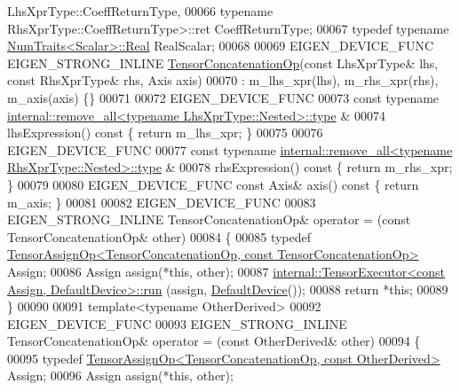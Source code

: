 \begin{DoxyCode}
      LhsXprType::CoeffReturnType,
00066                                                     \textcolor{keyword}{typename} RhsXprType::CoeffReturnType>::ret 
      CoeffReturnType;
00067     \textcolor{keyword}{typedef} \textcolor{keyword}{typename} \hyperlink{group___core___module_struct_eigen_1_1_num_traits}{NumTraits<Scalar>::Real} RealScalar;
00068 
00069     EIGEN\_DEVICE\_FUNC EIGEN\_STRONG\_INLINE \hyperlink{class_eigen_1_1_tensor_concatenation_op}{TensorConcatenationOp}(\textcolor{keyword}{const} LhsXprType& lhs,
       \textcolor{keyword}{const} RhsXprType& rhs, Axis axis)
00070         : m\_lhs\_xpr(lhs), m\_rhs\_xpr(rhs), m\_axis(axis) \{\}
00071 
00072     EIGEN\_DEVICE\_FUNC
00073     \textcolor{keyword}{const} \textcolor{keyword}{typename} \hyperlink{group___sparse_core___module}{internal::remove\_all<typename LhsXprType::Nested>::type}
      &
00074     lhsExpression()\textcolor{keyword}{ const }\{ \textcolor{keywordflow}{return} m\_lhs\_xpr; \}
00075 
00076     EIGEN\_DEVICE\_FUNC
00077     \textcolor{keyword}{const} \textcolor{keyword}{typename} \hyperlink{group___sparse_core___module}{internal::remove\_all<typename RhsXprType::Nested>::type}
      &
00078     rhsExpression()\textcolor{keyword}{ const }\{ \textcolor{keywordflow}{return} m\_rhs\_xpr; \}
00079 
00080     EIGEN\_DEVICE\_FUNC \textcolor{keyword}{const} Axis& axis()\textcolor{keyword}{ const }\{ \textcolor{keywordflow}{return} m\_axis; \}
00081 
00082     EIGEN\_DEVICE\_FUNC
00083     EIGEN\_STRONG\_INLINE TensorConcatenationOp& operator = (\textcolor{keyword}{const} TensorConcatenationOp& other)
00084     \{
00085       \textcolor{keyword}{typedef} \hyperlink{class_eigen_1_1_tensor_assign_op}{TensorAssignOp<TensorConcatenationOp, const TensorConcatenationOp>}
       Assign;
00086       Assign assign(*\textcolor{keyword}{this}, other);
00087       \hyperlink{class_eigen_1_1internal_1_1_tensor_executor}{internal::TensorExecutor<const Assign, DefaultDevice>::run}
      (assign, \hyperlink{struct_eigen_1_1_default_device}{DefaultDevice}());
00088       \textcolor{keywordflow}{return} *\textcolor{keyword}{this};
00089     \}
00090 
00091     \textcolor{keyword}{template}<\textcolor{keyword}{typename} OtherDerived>
00092     EIGEN\_DEVICE\_FUNC
00093     EIGEN\_STRONG\_INLINE TensorConcatenationOp& operator = (\textcolor{keyword}{const} OtherDerived& other)
00094     \{
00095       \textcolor{keyword}{typedef} \hyperlink{class_eigen_1_1_tensor_assign_op}{TensorAssignOp<TensorConcatenationOp, const OtherDerived>}
       Assign;
00096       Assign assign(*\textcolor{keyword}{this}, other);

\end{DoxyCode}
